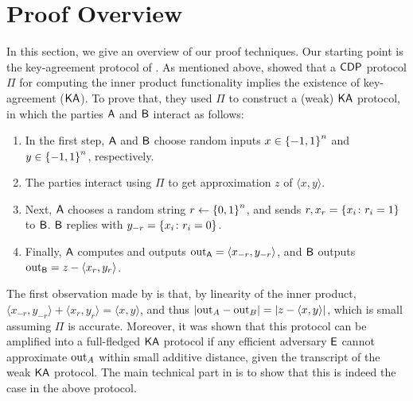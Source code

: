 \section{Proof Overview}\label{sec:overview}
In this section, we give an overview of our proof techniques. Our starting point is the key-agreement protocol of \cite{HaitnerMST22}. As mentioned above, \cite{HaitnerMST22} showed that a ${\sf CDP}$ protocol $\Pi$ for computing the inner product functionality implies the existence of key-agreement (${\sf KA}$). To prove that, they used $\Pi$  to construct a (weak) ${\sf KA}$ protocol, in which the parties $\mathsf{A}$ and $\mathsf{B}$ interact as follows:
\begin{enumerate}
    \item In the first step, $\mathsf{A}$ and $\mathsf{B}$ choose random inputs $x\in \set{-1,1}^n$ and $y\in \set{-1,1}^n$, respectively.
    \item The parties interact using $\Pi$ to get approximation $z$ of $\langle x,y \rangle$.
    \item Next, $\mathsf{A}$ chooses a random string $r \gets \zn$, and sends $r, x_r=\set{x_i \colon r_i=1}$ to $\mathsf{B}$. $\mathsf{B}$ replies with $y_{- r}=\set{x_i \colon r_i=0}$.
    \item Finally, $\mathsf{A}$ computes and outputs ${\rm out}_{\mathsf{A}}=\langle x_{-r},y_{-r} \rangle$, and $\mathsf{B}$ outputs ${\rm out}_{\mathsf{B}}=z-\langle x_{r},y_{r} \rangle$.
\end{enumerate}
The first observation made by \cite{HaitnerMST22} is that, by linearity of the inner product, $\langle x_{-r},y_{-r} \rangle+\langle x_{r},y_{r} \rangle=\langle x,y \rangle$, and thus $\size{\out_A-\out_B}=\size{z-\langle x,y \rangle}$, which is small assuming $\Pi$ is accurate. Moreover, it was shown that this protocol can be amplified into a full-fledged ${\sf KA}$ protocol if any efficient adversary $\mathsf{E}$ cannot  approximate ${\rm out}_A$ within small additive distance, given the transcript of the weak ${\sf KA}$ protocol. The main technical part in \cite{HaitnerMST22} is to show that this is indeed the case in the above protocol. 

